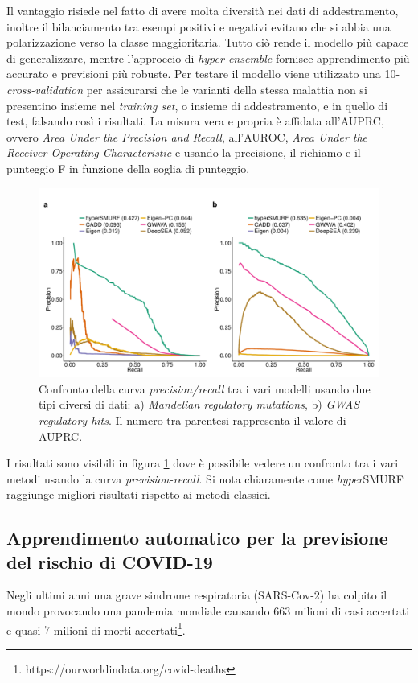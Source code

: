\documentclass[12pt,italian]{report}
\begin{document}
	Il vantaggio risiede nel fatto di avere molta diversità nei dati di addestramento, inoltre il bilanciamento tra esempi positivi e negativi evitano che si abbia una polarizzazione verso la classe maggioritaria. Tutto ciò rende il modello più capace di generalizzare, mentre l'approccio di \textit{hyper-ensemble} fornisce apprendimento più accurato e previsioni più robuste.
	Per testare il modello viene utilizzato una 10-\textit{cross-validation} per assicurarsi che le varianti della stessa malattia non si presentino insieme nel \textit{training set}, o insieme di addestramento, e in quello di test, falsando così i risultati. La misura vera e propria è affidata all'AUPRC, ovvero \textit{Area Under the Precision and Recall}, all'AUROC, \textit{Area Under the Receiver Operating Characteristic} e usando la precisione, il richiamo e il punteggio F in funzione della soglia di punteggio.
	
	\begin{figure}[h]
		\centering
		\includegraphics[width=0.7\linewidth]{immagini/ResultHyperSMURF}
		\caption{Confronto della curva \textit{precision/recall} tra i vari modelli usando due tipi diversi di dati: a) \textit{Mandelian regulatory mutations}, b) \textit{GWAS regulatory hits}. Il numero tra parentesi rappresenta il valore di AUPRC.}
		\label{fig:resulthypersmurf}
	\end{figure}

	I risultati sono visibili in figura \ref{fig:resulthypersmurf} dove è possibile vedere un confronto tra i vari metodi usando la curva \textit{prevision-recall}. Si nota chiaramente come \textit{hyper}SMURF raggiunge migliori risultati rispetto ai metodi classici.
	
	
	\subsection{Apprendimento automatico per la previsione del rischio di COVID-19}
	Negli ultimi anni una grave sindrome respiratoria (SARS-Cov-2) ha colpito il mondo provocando una pandemia mondiale causando $663$ milioni di casi accertati e quasi $7$ milioni di morti accertati\footnote{https://ourworldindata.org/covid-deaths}.
\end{document}
